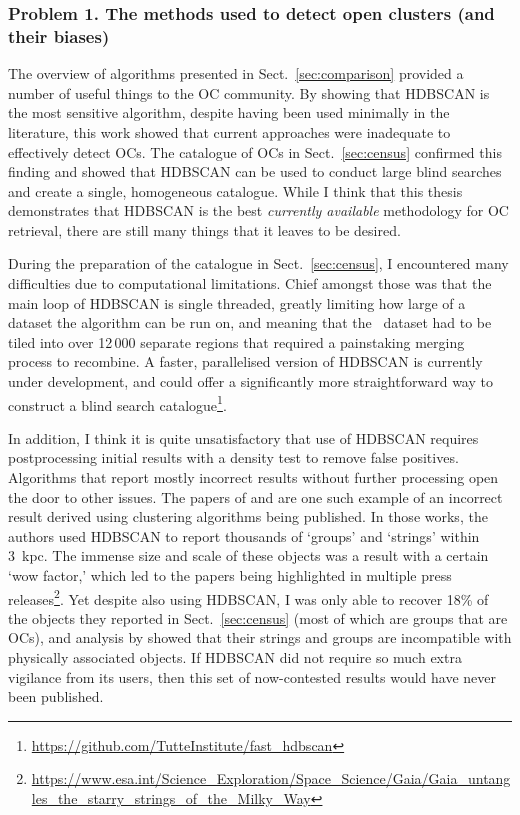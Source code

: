 \subsubsection{Problem 1. The methods used to detect open clusters (and their biases)}

The overview of algorithms presented in Sect.~\ref{sec:comparison} provided a number of useful things to the OC community. By showing that HDBSCAN is the most sensitive algorithm, despite having been used minimally in the literature, this work showed that current approaches were inadequate to effectively detect OCs. The catalogue of OCs in Sect.~\ref{sec:census} confirmed this finding and showed that HDBSCAN can be used to conduct large blind searches and create a single, homogeneous catalogue. While I think that this thesis demonstrates that HDBSCAN is the best \emph{currently available} methodology for OC retrieval, there are still many things that it leaves to be desired.

During the preparation of the catalogue in Sect.~\ref{sec:census}, I encountered many difficulties due to computational limitations. Chief amongst those was that the main loop of HDBSCAN is single threaded, greatly limiting how large of a dataset the algorithm can be run on, and meaning that the \gaia\ dataset had to be tiled into over 12\,000 separate regions that required a painstaking merging process to recombine. A faster, parallelised version of HDBSCAN is currently under development, and could offer a significantly more straightforward way to construct a blind search catalogue\footnote{\url{https://github.com/TutteInstitute/fast_hdbscan}}. 

In addition, I think it is quite unsatisfactory that use of HDBSCAN requires postprocessing initial results with a density test to remove false positives. Algorithms that report mostly incorrect results without further processing open the door to other issues. The papers of \cite{kounkel_untangling_2019} and \cite{kounkel_untangling_2020} are one such example of an incorrect result derived using clustering algorithms being published. In those works, the authors used HDBSCAN to report thousands of `groups' and `strings' within 3~kpc. The immense size and scale of these objects was a result with a certain `wow factor,' which led to the papers being highlighted in multiple press releases\footnote{\url{https://www.esa.int/Science_Exploration/Space_Science/Gaia/Gaia_untangles_the_starry_strings_of_the_Milky_Way}}. Yet despite also using HDBSCAN, I was only able to recover 18\% of the objects they reported in Sect.~\ref{sec:census} (most of which are groups that are OCs), and analysis by \cite{zucker_disconnecting_dots_2022} showed that their strings and groups are incompatible with physically associated objects. If HDBSCAN did not require so much extra vigilance from its users, then this set of now-contested results would have never been published.

